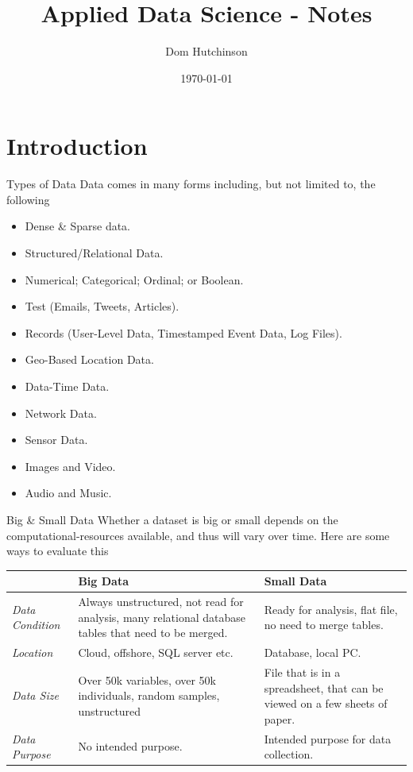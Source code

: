 \documentclass[11pt,a4paper]{article}
\begin{document}
\title{Applied Data Science - Notes}
\author{Dom Hutchinson}
\date{\today}
\maketitle

\tableofcontents\newpage

\section{Introduction}\label{sec_introduction}

  \begin{remark}{Types of Data}
    Data comes in many forms including, but not limited to, the following
    \begin{itemize}
      \item Dense \& Sparse data.
      \item Structured/Relational Data.
      \item Numerical; Categorical; Ordinal; or Boolean.
      \item Test (Emails, Tweets, Articles).
      \item Records (User-Level Data, Timestamped Event Data, Log Files).
      \item Geo-Based Location Data.
      \item Data-Time Data.
      \item Network Data.
      \item Sensor Data.
      \item Images and Video.
      \item Audio and Music.
    \end{itemize}
  \end{remark}

  \begin{remark}{Big \& Small Data}
    Whether a dataset is big or small depends on the computational-resources available, and thus will vary over time. Here are some ways to evaluate this
    \begin{center}
      \begin{tabular}{l|p{6cm}|p{6cm}}
        &\textbf{Big Data}&\textbf{Small Data}\\\hline
        \textit{Data Condition}&Always unstructured, not read for analysis, many relational database tables that need to be merged.&Ready for analysis, flat file, no need to merge tables.\\\hline
        \textit{Location}&Cloud, offshore, SQL server etc.&Database, local PC.\\\hline
        \textit{Data Size}&Over 50k variables, over 50k individuals, random samples, unstructured&File that is in a spreadsheet, that can be viewed on a few sheets of paper.\\\hline
        \textit{Data Purpose}&No intended purpose.&Intended purpose for data collection.
      \end{tabular}
    \end{center}
  \end{remark}
\end{document}

